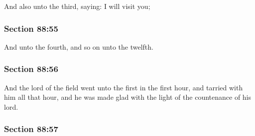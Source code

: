 		And also unto the third, saying: I will visit you;


	\subsubsection{Section 88:55} %
		\label{DC88-55}

		And unto the fourth, and so on unto the twelfth.


	\subsubsection{Section 88:56} %
		\label{DC88-56}

		And the lord of the field went unto the first in the first hour, and tarried with him all that hour, and he was made glad with the light of the countenance of his lord.


	\subsubsection{Section 88:57} %
		\label{DC88-57}


